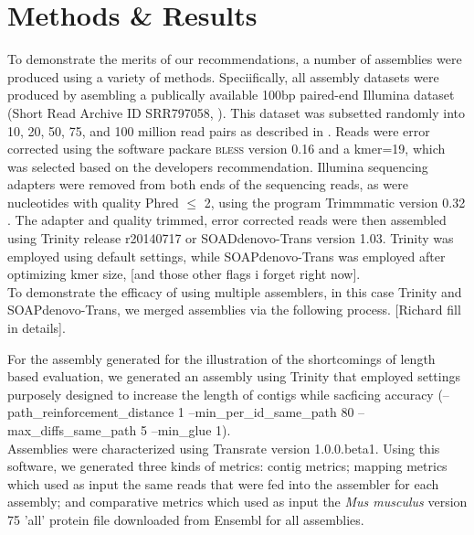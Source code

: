 \section*{Methods & Results}

To demonstrate the merits of our recommendations, a number of assemblies were produced using a variety of methods. Speciifically, all assembly datasets were produced by asembling a publically available 100bp paired-end Illumina dataset (Short Read Archive ID SRR797058, \citep{Macfarlan:2012js}). This dataset was subsetted randomly into 10, 20, 50, 75, and 100 million read pairs as described in \citep{MacManes:2014io}. Reads were error corrected using the software packare \textsc{bless} version 0.16 \citep{Heo:2014cb} and a kmer=19, which was selected based on the developers recommendation.  Illumina sequencing adapters were removed from both ends of the sequencing reads, as were nucleotides with quality Phred $\leq$ 2, using the program Trimmmatic version 0.32 \citep{Bolger:2014ek}. The adapter and quality trimmed, error corrected reads were then assembled using Trinity release r20140717 or SOADdenovo-Trans version 1.03. Trinity was employed using default settings, while SOAPdenovo-Trans was employed after optimizing kmer size, [and those other flags i forget right now]. \\

To demonstrate the efficacy of using multiple assemblers, in this case Trinity and SOAPdenovo-Trans, we merged assemblies via the following process. [Richard fill in details].

For the assembly generated for the illustration of the shortcomings of length based evaluation, we generated an assembly using Trinity that employed settings purposely designed to increase the length of contigs while sacficing accuracy (--path\_reinforcement\_distance 1 --min\_per\_id\_same\_path 80  --max\_diffs\_same\_path 5 --min\_glue 1). \\

Assemblies were characterized using Transrate version 1.0.0.beta1. Using this software, we generated three kinds of metrics: contig metrics; mapping metrics which used as input the same reads that were fed into the assembler for each assembly; and comparative metrics which used as input the \textit{Mus musculus} version 75 'all' protein file downloaded from Ensembl for all assemblies.

